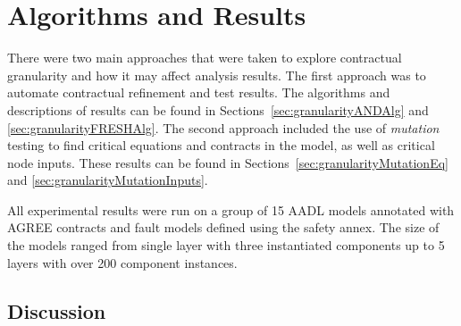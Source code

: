 \section{Algorithms and Results}
There were two main approaches that were taken to explore contractual granularity and how it may affect analysis results. The first approach was to automate contractual refinement and test results. The algorithms and descriptions of results can be found in Sections~\ref{sec:granularityANDAlg} and \ref{sec:granularityFRESHAlg}. The second approach included the use of {\em mutation} testing to find critical equations and contracts in the model, as well as critical node inputs. These results can be found in Sections~\ref{sec:granularityMutationEq} and \ref{sec:granularityMutationInputs}. 

All experimental results were run on a group of 15 AADL models annotated with AGREE contracts and fault models defined using the safety annex. The size of the models ranged from single layer with three instantiated components up to 5 layers with over 200 component instances. 







\subsection{Discussion}